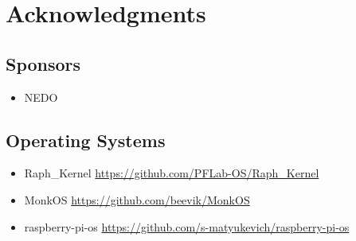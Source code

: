 \section{Acknowledgments}

\subsection{Sponsors}

\begin{itemize}
\item NEDO
\end{itemize}

\subsection{Operating Systems}

\begin{itemize}
\item Raph\_Kernel \url{https://github.com/PFLab-OS/Raph_Kernel}
\item MonkOS \url{https://github.com/beevik/MonkOS}
\item raspberry-pi-os \url{https://github.com/s-matyukevich/raspberry-pi-os}
\end{itemize}

